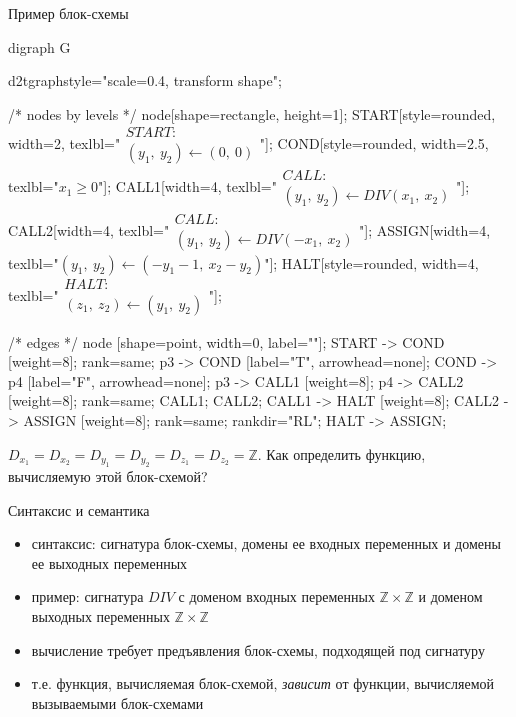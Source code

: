 \documentclass[hyperref={unicode=true}]{beamer}
\begin{document}
	\begin{frame}[fragile]{Пример блок-схемы}

	\huge
	\begin{dot2tex}[options=-traw]
	digraph G{
		d2tgraphstyle="scale=0.4, transform shape";

		/* nodes by levels */
		node[shape=rectangle, height=1];
		START[style=rounded, width=2, texlbl="$\begin{matrix}START:\\(y_1,~y_2) \leftarrow (0,~0)\end{matrix}$"];
        COND[style=rounded, width=2.5, texlbl="$x_1 \geq 0$"];
		CALL1[width=4, texlbl="$\begin{matrix}CALL:\\(y_1,~y_2) \leftarrow DIV(x_1,~x_2)\end{matrix}$"];
		CALL2[width=4, texlbl="$\begin{matrix}CALL:\\(y_1,~y_2) \leftarrow DIV(-x_1,~x_2)\end{matrix}$"];
		ASSIGN[width=4, texlbl="$(y_1,~y_2) \leftarrow (-y_1-1,~x_2 - y_2)$"];
        HALT[style=rounded, width=4, texlbl="$\begin{matrix}HALT:\\(z_1,~z_2) \leftarrow (y_1,~y_2)\end{matrix}$"];

		/* edges */
		node [shape=point, width=0, label=""];
		START -> COND [weight=8];
		{ rank=same; p3 -> COND [label="T", arrowhead=none]; COND -> p4 [label="F", arrowhead=none]; }
		p3 -> CALL1 [weight=8];
		p4 -> CALL2 [weight=8];
		{ rank=same; CALL1; CALL2; }
		CALL1 -> HALT [weight=8];
		CALL2 -> ASSIGN [weight=8];
		{ rank=same; rankdir="RL"; HALT -> ASSIGN; }
        }
	\end{dot2tex}

	\normalsize

    $D_{x_1} = D_{x_2} = D_{y_1} = D_{y_2} = D_{z_1} = D_{z_2} = \mathbb{Z}$.
    Как определить функцию, вычисляемую этой блок-схемой?
	\end{frame}

    \begin{frame}{Синтаксис и семантика}
    \begin{itemize}
    \item синтаксис: сигнатура блок-схемы, домены ее входных переменных и
            домены ее выходных переменных
    \item пример: сигнатура $DIV$ с
          доменом входных переменных $\mathbb{Z} \times \mathbb{Z}$ и
          доменом выходных переменных $\mathbb{Z} \times \mathbb{Z}$
    \item вычисление требует предъявления блок-схемы, подходящей под сигнатуру
    \item т.е. функция, вычисляемая блок-схемой, \emph{зависит}
          от функции, вычисляемой вызываемыми блок-схемами
    \end{itemize}
    \end{frame}
\end{document}
